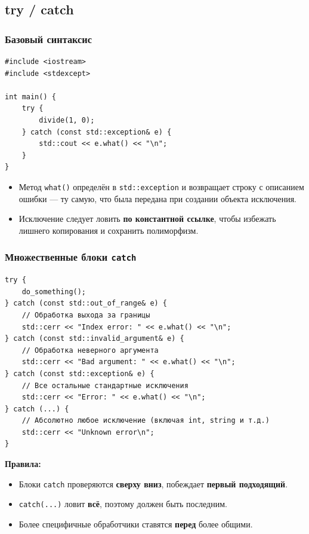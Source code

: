 \documentclass[a4paper,12pt]{article}
\begin{document}
\subsection{try / catch}

\subsubsection{Базовый синтаксис}

\begin{lstlisting}
#include <iostream>
#include <stdexcept>

int main() {
    try {
        divide(1, 0);
    } catch (const std::exception& e) {
        std::cout << e.what() << "\n";
    }
}
\end{lstlisting}

\begin{itemize}
    \item Метод \texttt{what()} определён в \texttt{std::exception}
          и возвращает строку с описанием ошибки --- ту самую, что
          была передана при создании объекта исключения.
    \item Исключение следует ловить \textbf{по константной ссылке},
          чтобы избежать лишнего копирования и сохранить полиморфизм.
\end{itemize}

\subsubsection{Множественные блоки \texttt{catch}}

\begin{lstlisting}
try {
    do_something();
} catch (const std::out_of_range& e) {
    // Обработка выхода за границы
    std::cerr << "Index error: " << e.what() << "\n";
} catch (const std::invalid_argument& e) {
    // Обработка неверного аргумента
    std::cerr << "Bad argument: " << e.what() << "\n";
} catch (const std::exception& e) {
    // Все остальные стандартные исключения
    std::cerr << "Error: " << e.what() << "\n";
} catch (...) {
    // Абсолютно любое исключение (включая int, string и т.д.)
    std::cerr << "Unknown error\n";
}
\end{lstlisting}

\textbf{Правила:}
\begin{itemize}
    \item Блоки \texttt{catch} проверяются \textbf{сверху вниз},
          побеждает \textbf{первый подходящий}.
    \item \texttt{catch(...)} ловит \textbf{всё}, поэтому должен быть последним.
    \item Более специфичные обработчики ставятся \textbf{перед} более общими.
\end{itemize}
\end{document}
